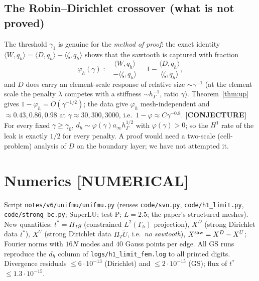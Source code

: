 \documentclass[11pt]{article}
\theoremstyle{remark}
\newcommand{\hG}{h_\Gamma}
\newcommand{\Gh}{\Gamma_h}
\newcommand{\PT}{\Pi_T}
\newcommand{\ip}[2]{\langle #1,#2\rangle}
\newcommand{\Ut}{\tilde U}
\newcommand{\lab}[1]{\textbf{[#1]}}
\begin{document}
\subsection*{The Robin--Dirichlet crossover (what is not proved)}
The threshold $\gamma_1$ is genuine for the \emph{method of proof}: the exact identity $\ip W{q_h}=\ip D{q_h}-\ip\zeta{q_h}$ shows that the sawtooth is captured with fraction
\[
\varphi_h(\gamma):=\frac{\ip W{q_h}}{-\ip\zeta{q_h}}=1-\frac{\ip D{q_h}}{\ip\zeta{q_h}},
\]
and $D$ does carry an element-scale response of relative size $\sim\gamma^{-1}$ (at the element scale the penalty $\lambda$ competes with a stiffness $\sim\hG^{-1}$, ratio $\gamma$). Theorem~\ref{thm:up} gives $1-\varphi_h=O(\gamma^{-1/2})$; the data give $\varphi_h$ mesh-independent and $\approx0.43,0.86,0.98$ at $\gamma\approx30,300,3000$, i.e.\ $1-\varphi\approx C\gamma^{-0.8}$. \lab{CONJECTURE} For every fixed $\gamma\ge\gamma_0$, $d_h\sim\varphi(\gamma)a_\infty\hG^{1/2}$ with $\varphi(\gamma)>0$; so the $H^1$ rate of the leak is exactly $1/2$ for every penalty. A proof would need a two-scale (cell-problem) analysis of $D$ on the boundary layer; we have not attempted it.

\section{Numerics \lab{NUMERICAL}}
Script \texttt{notes/v6/unifmu/unifmu.py} (reuses \texttt{code/svn.py}, \texttt{code/h1\_limit.py}, \texttt{code/strong\_bc.py}; SuperLU; test P; $L=2.5$; the paper's structured meshes). New quantities: $t^\ast=\PT g$ (constrained $L^2(\Gh)$ projection), $X^D$ (strong Dirichlet data $t^\ast$), $X^U$ (strong Dirichlet data $\PT\Ut$, i.e.\ \emph{no sawtooth}), $X^{\rm saw}=X^D-X^U$; Fourier norms with $16N$ modes and $40$ Gauss points per edge. All GS runs reproduce the $d_h$ column of \texttt{logs/h1\_limit\_fem.log} to all printed digits. Divergence residuals $\le6\cdot10^{-13}$ (Dirichlet) and $\le2\cdot10^{-15}$ (GS); flux of $t^\ast$ $\le1.3\cdot10^{-15}$.
\end{document}
